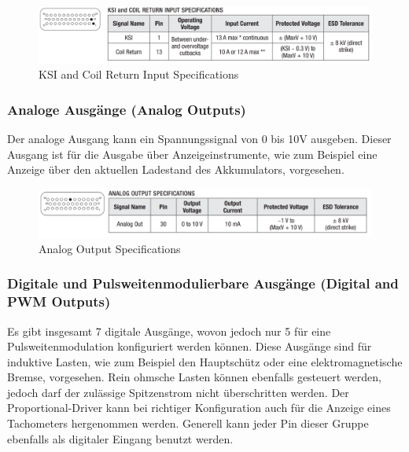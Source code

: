 \begin{figure}[H]
	\begin{center}
		\includegraphics[width=\textwidth]{figures/antrieb/KSI_CoilReturn_Input_Specifications.png}
		\caption{KSI and Coil Return Input Specifications}
	\end{center}
\end{figure}



\subsubsection{Analoge Ausgänge (Analog Outputs)}
Der analoge Ausgang kann ein Spannungssignal von 0 bis 10V ausgeben. Dieser Ausgang ist für die Ausgabe über Anzeigeinstrumente, wie zum Beispiel eine Anzeige über den aktuellen Ladestand des Akkumulators, vorgesehen.

\begin{figure}[H]
	\begin{center}
		\includegraphics[width=\textwidth]{figures/antrieb/Analog_Output_Specifications.png}
		\caption{Analog Output Specifications}
	\end{center}
\end{figure}


\newpage



\subsubsection{Digitale und Pulsweitenmodulierbare Ausgänge (Digital and PWM Outputs)}
Es gibt insgesamt 7 digitale Ausgänge, wovon jedoch nur 5 für eine Pulsweitenmodulation konfiguriert werden können. Diese Ausgänge sind für induktive Lasten, wie zum Beispiel den Hauptschütz oder eine elektromagnetische Bremse, vorgesehen. Rein ohmsche Lasten können ebenfalls gesteuert werden, jedoch darf der zulässige Spitzenstrom nicht überschritten werden. Der Proportional-Driver kann bei richtiger Konfiguration auch für die Anzeige eines Tachometers hergenommen werden. Generell kann jeder Pin dieser Gruppe ebenfalls als digitaler Eingang benutzt werden.

